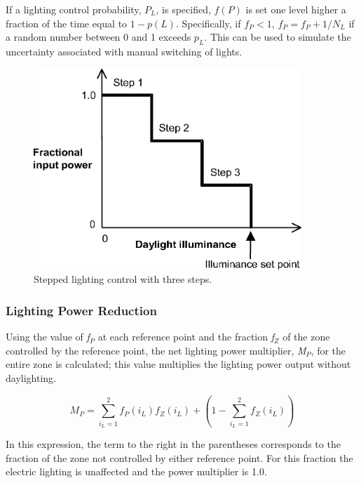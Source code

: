 If a lighting control probability, $P_L$, is specified, $f(P)$ is set one level higher a fraction of the time equal to $1-p(L)$. Specifically, if $f_P<1$, $f_P = f_P+1/N_L$ if a random number between 0 and 1 exceeds $p_L$. This can be used to simulate the uncertainty associated with manual switching of lights.

\begin{figure}[hbtp] %
\centering
\includegraphics[width=0.9\textwidth, height=0.9\textheight, keepaspectratio=true]{media/image825.png}
\caption{Stepped lighting control with three steps. \protect \label{fig:stepped-lighting-control-with-three-steps.}}
\end{figure}

\subsubsection{Lighting Power Reduction}\label{lighting-power-reduction}

Using the value of \emph{f\(_{P}\)} at each reference point and the fraction \emph{f\(_{Z}\)} of the zone controlled by the reference point, the net lighting power multiplier, \emph{M\(_{P}\)}, for the entire zone is calculated; this value multiplies the lighting power output without daylighting.

\begin{equation}
{M_P} = \sum\limits_{{i_L} = 1}^2 {{f_P}({i_L})} {f_Z}({i_L}) + \left( {1 - \sum\limits_{{i_L} = 1}^2 {} {f_Z}({i_L})} \right)
\end{equation}

In this expression, the term to the right in the parentheses corresponds to the fraction of the zone not controlled by either reference point. For this fraction the electric lighting is unaffected and the power multiplier is 1.0.

